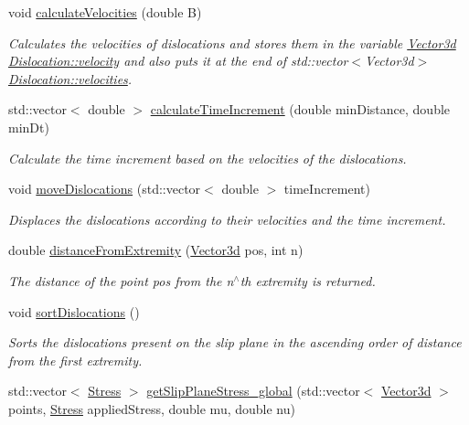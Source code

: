 \begin{DoxyCompactItemize}
void \hyperlink{classSlipPlane_aff7af69ba5235da6c8b142193509683c}{calculate\-Velocities} (double \-B)
\begin{DoxyCompactList}\small\item\em \-Calculates the velocities of dislocations and stores them in the variable \hyperlink{classVector3d}{\-Vector3d} \hyperlink{classDislocation_ad6f4e8e94b2525c2e58a77b9d2916c0e}{\-Dislocation\-::velocity} and also puts it at the end of std\-::vector$<$\-Vector3d$>$ \hyperlink{classDislocation_a9ccdef63384a8b965e70f13920a852f8}{\-Dislocation\-::velocities}. \end{DoxyCompactList}\item 
std\-::vector$<$ double $>$ \hyperlink{classSlipPlane_a255d67230132cf1c7bf18f61098a8b4f}{calculate\-Time\-Increment} (double min\-Distance, double min\-Dt)
\begin{DoxyCompactList}\small\item\em \-Calculate the time increment based on the velocities of the dislocations. \end{DoxyCompactList}\item 
void \hyperlink{classSlipPlane_a88bc78651af7a440ab41c3d28baea5c0}{move\-Dislocations} (std\-::vector$<$ double $>$ time\-Increment)
\begin{DoxyCompactList}\small\item\em \-Displaces the dislocations according to their velocities and the time increment. \end{DoxyCompactList}\item 
double \hyperlink{classSlipPlane_a3523030cccb520b5253a811d062f3ddf}{distance\-From\-Extremity} (\hyperlink{classVector3d}{\-Vector3d} pos, int n)
\begin{DoxyCompactList}\small\item\em \-The distance of the point pos from the n$^\wedge$th extremity is returned. \end{DoxyCompactList}\item 
void \hyperlink{classSlipPlane_a7fc607c17e5532aed5e93339dc03b18d}{sort\-Dislocations} ()
\begin{DoxyCompactList}\small\item\em \-Sorts the dislocations present on the slip plane in the ascending order of distance from the first extremity. \end{DoxyCompactList}\item 
std\-::vector$<$ \hyperlink{classStress}{\-Stress} $>$ \hyperlink{classSlipPlane_a1cc47e2092a588ff04fd14e9ce9e5906}{get\-Slip\-Plane\-Stress\-\_\-global} (std\-::vector$<$ \hyperlink{classVector3d}{\-Vector3d} $>$ points, \hyperlink{classStress}{\-Stress} applied\-Stress, double mu, double nu)

\end{DoxyCompactItemize}
